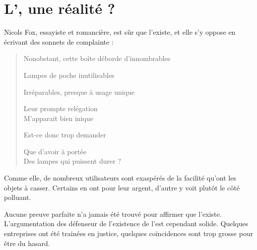 \section{L'\op, une réalité ?}

Nicols Fox, essayiste et romancière, est sûr que l'\op existe, et elle s'y oppose en écrivant des sonnets de complainte : 
\itshape\begin{center}
\begin{verse}
Nonobstant, cette boîte déborde d'innombrables

Lampes de poche inutilisables

Irréparables, presque à usage unique

Leur prompte relégation\\
M'apparait bien inique

Est-ce donc trop demander

Que d'avoir à portée\\
Des lampes qui puissent durer ?
\end{verse}
\end{center}
\normalfont
Comme elle, de nombreux utilisateurs sont exaspérés de la facilité qu'ont les objets à casser. Certains en ont pour leur argent, d'autre y voit plutôt le côté polluant. 

\smallbreak

Aucune preuve parfaite n'a jamais été trouvé pour affirmer que l'\op existe. L'argumentation des défenseur de l'existence de l'\op est cependant solide. Quelques entreprises ont été trainées en justice, quelques coïncidences sont trop grosse pour être du hasard. 